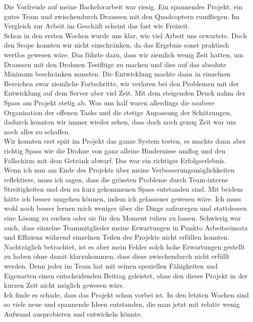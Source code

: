 Die Vorfreude auf meine Bachelorarbeit war riesig. Ein spannendes Projekt, ein gutes Team und zwischendurch Draussen mit den Quadcoptern rumfliegen. Im Vergleich zur Arbeit im Geschäft scheint das fast wie Freizeit.\\

Schon in den ersten Wochen wurde uns klar, wie viel Arbeit uns erwartete. Doch den Scope konnten wir nicht einschränken, da das Ergebnis sonst praktisch wertlos gewesen wäre. Das führte dazu, dass wir ziemlich wenig Zeit hatten, um Draussen mit den Drohnen Testflüge zu machen und dies auf das absolute Minimum beschränken mussten. Die Entwicklung machte dann in einzelnen Bereichen zwar ziemliche Fortschritte, wir verloren bei den Problemen mit der Entwicklung auf dem Server aber viel Zeit. Mit dem steigenden Druck nahm der Spass am Projekt stetig ab. Was uns half waren allerdings die saubere Organisation der offenen Tasks und die stetige Anpassung der Schätzungen, dadurch konnten wir immer wieder sehen, dass doch noch genug Zeit war um noch alles zu schaffen.\\

Wir konnten erst spät im Projekt das ganze System testen, es machte dann aber richtig Spass wie die Drohne von ganz alleine Hindernisse umflog und den Fallschirm mit dem Getränk abwarf. Das war ein richtiges Erfolgserlebnis.\\

Wenn ich nun am Ende des Projekts über meine Verbesserungsmöglichkeiten reflektiere, muss ich sagen, dass die grössten Probleme durch Team-interne Streitigkeiten und den zu kurz gekommenen Spass entstanden sind. Mit beidem hätte ich besser umgehen können, indem ich gelassener gewesen wäre. Ich muss wohl noch besser lernen mich weniger über die Dinge aufzuregen und stattdessen eine Lösung zu suchen oder sie für den Moment ruhen zu lassen. Schwierig war auch, dass einzelne Teammitglieder meine Erwartungen in Punkto Arbeitseinsatz und Effizienz während einzelnen Teilen des Projekts nicht erfüllen konnten. Nachträglich betrachtet, ist es aber mein Fehler solch hohe Erwartungen gestellt zu haben ohne damit klarzukommen, dass diese zwischendurch nicht erfüllt werden. Denn jeder im Team hat mit seinen speziellen Fähigkeiten und Eigenarten einen entscheidenden Beitrag geleistet, ohne den dieses Projekt in der kurzen Zeit nicht möglich gewesen wäre. \\

Ich finde es schade, dass das Projekt schon vorbei ist. In den letzten Wochen sind so viele neue und spannende Ideen entstanden, die man jetzt mit relativ wenig Aufwand ausprobieren und entwickeln könnte.